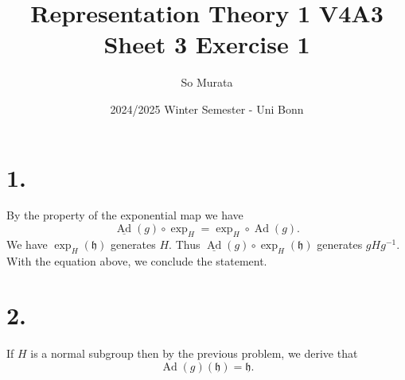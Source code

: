 \documentclass{article}
\title{Representation Theory 1 V4A3 Sheet 3 Exercise 1}
\author{So Murata}
\date{2024/2025 Winter Semester - Uni Bonn}
\numberwithin{equation}{section}
\DeclareMathOperator{\Ad}{Ad}
\begin{document}
\maketitle

\section*{1.}

By the property of the exponential map we have
\begin{equation*}
\underline{\Ad}(g)\circ \exp_H = \exp_H\circ\Ad(g).
\end{equation*}
We have $\exp_H(\mathfrak{h})$ generates $H$. Thus $\underline{\Ad}(g)\circ\exp_H(\mathfrak{h})$ generates $gHg^{-1}$. With the equation above, we conclude the statement.

\section*{2.}

If $H$ is a normal subgroup then by the previous problem, we derive that 
\begin{equation*}
\Ad(g)(\mathfrak{h}) = \mathfrak{h}.
\end{equation*}
\end{document}
